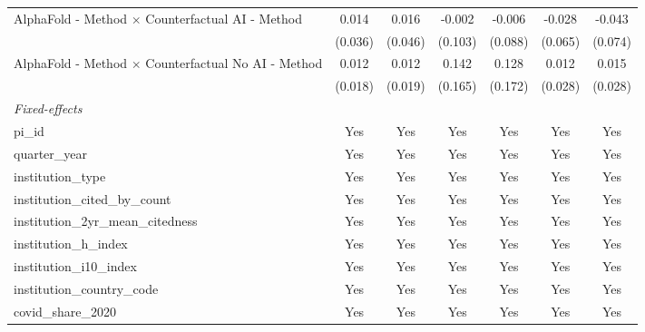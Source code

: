 \begin{tabular}{lcccccc}
   AlphaFold - Method $\times$ Counterfactual AI - Method      & 0.014         & 0.016         & -0.002        & -0.006        & -0.028         & -0.043\\   
                                                               & (0.036)       & (0.046)       & (0.103)       & (0.088)       & (0.065)        & (0.074)\\   
   AlphaFold - Method $\times$ Counterfactual No AI - Method   & 0.012         & 0.012         & 0.142         & 0.128         & 0.012          & 0.015\\   
                                                               & (0.018)       & (0.019)       & (0.165)       & (0.172)       & (0.028)        & (0.028)\\   
   \midrule
   \emph{Fixed-effects}\\
   pi\_id                                                      & Yes           & Yes           & Yes           & Yes           & Yes            & Yes\\  
   quarter\_year                                               & Yes           & Yes           & Yes           & Yes           & Yes            & Yes\\  
   institution\_type                                           & Yes           & Yes           & Yes           & Yes           & Yes            & Yes\\  
   institution\_cited\_by\_count                               & Yes           & Yes           & Yes           & Yes           & Yes            & Yes\\  
   institution\_2yr\_mean\_citedness                           & Yes           & Yes           & Yes           & Yes           & Yes            & Yes\\  
   institution\_h\_index                                       & Yes           & Yes           & Yes           & Yes           & Yes            & Yes\\  
   institution\_i10\_index                                     & Yes           & Yes           & Yes           & Yes           & Yes            & Yes\\  
   institution\_country\_code                                  & Yes           & Yes           & Yes           & Yes           & Yes            & Yes\\  
   covid\_share\_2020                                          & Yes           & Yes           & Yes           & Yes           & Yes            & Yes\\  

\end{tabular}
